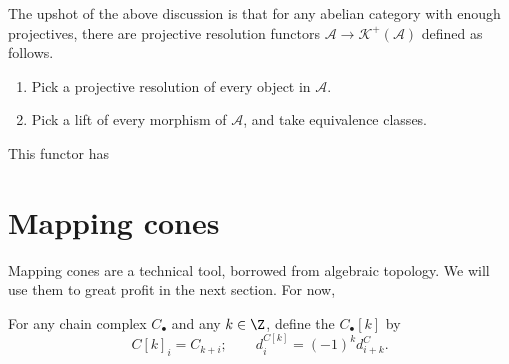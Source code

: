 \documentclass[main.tex]{subfiles}
\begin{document}

The upshot of the above discussion is that for any abelian category with enough projectives, there are projective resolution functors $\mathcal{A} \to \mathcal{K}^{+}(\mathcal{A})$ defined as follows.
\begin{enumerate}
  \item Pick a projective resolution of every object in $\mathcal{A}$.

  \item Pick a lift of every morphism of $\mathcal{A}$, and take equivalence classes.
\end{enumerate}

This functor has

\section{Mapping cones}
\label{sec:mapping_cones}

Mapping cones are a technical tool, borrowed from algebraic topology. We will use them to great profit in the next section. For now, 


\begin{definition}
  \label{def:shift_functor}
  For any chain complex $C_{\bullet}$ and any $k \in \Z$, define the  $C_{\bullet}[k]$ by
  \begin{equation*}
    C[k]_{i} = C_{k+i};\qquad d^{C[k]}_{i} = (-1)^{k}d^{C}_{i+k}.
  \end{equation*}
\end{definition}
\end{document}
